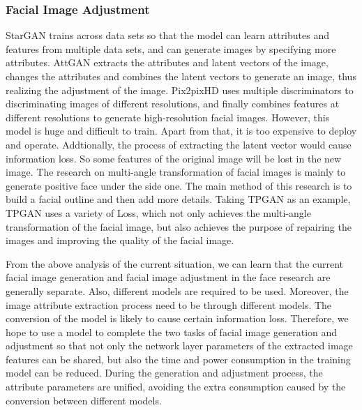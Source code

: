 \subsubsection*{Facial Image Adjustment}
StarGAN trains across data sets so that the model can learn attributes and features from multiple data sets,
    and can generate images by specifying more attributes.
AttGAN extracts the attributes and latent vectors of the image,
    changes the attributes and combines the latent vectors to generate an image,
    thus realizing the adjustment of the image.
Pix2pixHD uses multiple discriminators to discriminating images of different resolutions,
    and finally combines features at different resolutions to generate high-resolution facial images.
However, this model is huge and difficult to train.
Apart from that, it is too expensive to deploy and operate.
Addtionally, the process of extracting the latent vector would cause information loss.
So some features of the original image will be lost in the new image.
The research on multi-angle transformation of facial images is mainly to generate positive face under the side one.
The main method of this research is to build a facial outline and then add more details.
Taking TPGAN as an example, TPGAN uses a variety of Loss,
    which not only achieves the multi-angle transformation of the facial image,
    but also achieves the purpose of repairing the images and improving the quality of the facial image.

\vspace{3ex}

From the above analysis of the current situation,
    we can learn that the current facial image generation and facial image adjustment in the face research are generally separate.
Also, different models are required to be used.
Moreover, the image attribute extraction process need to be through different models.
The conversion of the model is likely to cause certain information loss.
Therefore, we hope to use a model to complete the two tasks of facial image generation and adjustment so that not only the network layer parameters of the extracted image features can be shared,
    but also the time and power consumption in the training model can be reduced.
During the generation and adjustment process, the attribute parameters are unified,
    avoiding the extra consumption caused by the conversion between different models.